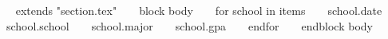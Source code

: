 ~{ extends "section.tex" }~
~{ block body }~
  ~{ for school in items }~
    \school
      {~{{ school.date }}~}
      {~{{ school.school }}~}
      {~{{ school.major }}~}
      {~{{ school.gpa }}~}
  ~{ endfor }~
~{ endblock body }~
